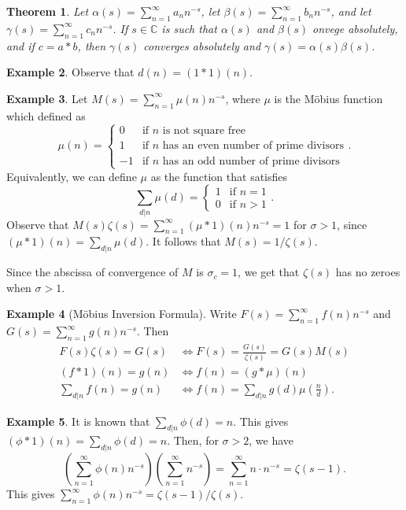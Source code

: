 \documentclass[11pt]{article}
\newtheorem{thm}{Theorem}[section]
\theoremstyle{definition}
\newtheorem{example}[thm]{Example}
\newcommand{\s}[0]{\sigma}
\newcommand{\CC}{\mathbb{C}}
\begin{document}
\begin{thm}
Let $\alpha(s)=\sum_{n=1}^\infty a_nn^{-s}$, let $\beta(s)=\sum_{n=1}^\infty b_nn^{-s}$,
and let $\gamma(s)=\sum_{n=1}^\infty c_nn^{-s}$. If $s\in\CC$ is such that $\alpha(s)$ and
$\beta(s)$ onvege absolutely, and if $c=a*b$, then $\gamma(s)$ converges absolutely and
$\gamma(s)=\alpha(s)\beta(s)$.
\end{thm}

\begin{example}
Observe that $d(n)=(1*1)(n)$.
\end{example}

\begin{example}
Let $M(s)=\sum_{n=1}^\infty\mu(n)n^{-s}$, where $\mu$ is the M\"obius function which
defined as
\[
  \mu(n) = \begin{cases}
  0 &\text{if } n \text{ is not square free} \\
  1 &\text{if } n \text{ has an even number of prime divisors} \\
  -1 &\text{if } n \text{ has an odd number of prime divisors}
  \end{cases} .
\]
Equivalently, we can define $\mu$ as the function that satisfies
\[
  \sum_{d|n}\mu(d) = \begin{cases}
  1 &\text{if } n = 1 \\
  0 &\text{if } n > 1
  \end{cases} .
\]
Observe that $M(s)\zeta(s) = \sum_{n=1}^\infty(\mu*1)(n)n^{-s} = 1$ for $\s>1$, since
$(\mu*1)(n)=\sum_{d|n}\mu(d)$. It follows that $M(s)=1/\zeta(s)$.

Since the abscissa of convergence of $M$ is $\s_c=1$, we get that $\zeta(s)$ has no zeroes
when $\s>1$.
\end{example}

\begin{example}[M\"obius Inversion Formula]
Write $F(s)=\sum_{n=1}^\infty f(n)n^{-s}$ and $G(s)=\sum_{n=1}^\infty g(n)n^{-s}$. Then
\begin{align*}
F(s)\zeta(s) = G(s) &\iff F(s) = \frac{G(s)}{\zeta(s)} = G(s)M(s) \\
(f*1)(n) = g(n) &\iff f(n) = (g*\mu)(n) \\
\sum_{d|n} f(n) = g(n) &\iff f(n) = \sum_{d|n} g(d)\mu\left(\frac{n}{d}\right) .
\end{align*}
\end{example}

\begin{example}
It is known that $\sum_{d|n}\phi(d)=n$. This gives $(\phi*1)(n)=\sum_{d|n}\phi(d)=n$. Then,
for $\s>2$, we have
\[
\left(\sum_{n=1}^\infty \phi(n)n^{-s}\right) \left(\sum_{n=1}^\infty n^{-s}\right)
= \sum_{n=1}^\infty n\cdot n^{-s} = \zeta(s-1) .
\]
This gives $\sum_{n=1}^\infty\phi(n)n^{-s}=\zeta(s-1)/\zeta(s)$.
\end{example}
\end{document}
